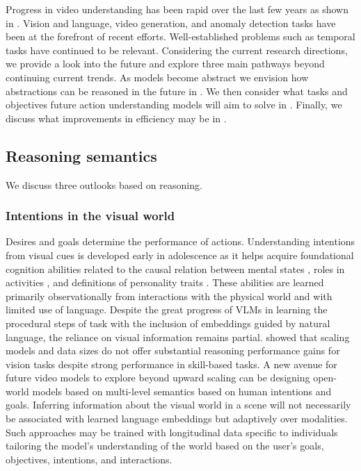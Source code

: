 Progress in video understanding has been rapid over the last few years as shown in . Vision and language, video generation, and anomaly detection tasks have been at the forefront of recent efforts. Well-established problems such as temporal tasks have continued to be relevant. Considering the current research directions, we provide a look into the future and explore three main pathways beyond continuing current trends. As models become abstract we envision how abstractions can be reasoned in the future in . We then consider what tasks and objectives future action understanding models will aim to solve in . Finally, we discuss what improvements in efficiency may be in .





\subsection{Reasoning semantics}
\label{sec:outlook::reason}

We discuss three outlooks based on reasoning.

\subsubsection{Intentions in the visual world}

Desires and goals determine the performance of actions. Understanding intentions from visual cues is developed early in adolescence \citep{flavell1999cognitive} as it helps acquire foundational cognition abilities related to the causal relation between mental states \citep{flavell1998social}, roles in activities \citep{woodward2009infants}, and definitions of personality traits \citep{nelson1980factors}. These abilities are learned primarily observationally from interactions with the physical world and with limited use of language. Despite the great progress of VLMs in learning the procedural steps of task \citep{li2025llama,li2024mini,wu2024longvideobench} with the inclusion of embeddings guided by natural language, the reliance on visual information remains partial. \citet{al2024unibench} showed that scaling models and data sizes do not offer substantial reasoning performance gains for vision tasks despite strong performance in skill-based tasks. A new avenue for future video models to explore beyond upward scaling can be designing open-world models based on multi-level semantics based on human intentions and goals. Inferring information about the visual world in a scene will not necessarily be associated with learned language embeddings but adaptively over modalities. Such approaches may be trained with longitudinal data specific to individuals tailoring the model's understanding of the world based on the user's goals, objectives, intentions, and interactions.



